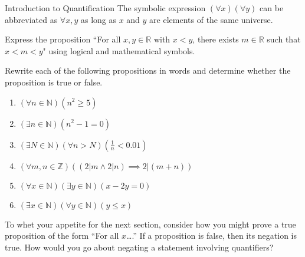 \begin{section}{Introduction to Quantification}
The symbolic expression $(\forall x)(\forall y)$ can be abbreviated as $\boxed{\forall x,y}$ as long as $x$ and $y$ are elements of the same universe.

\begin{problem}
Express the proposition ``For all $x,y\in\mathbb{R}$ with $x<y$, there exists $m\in\mathbb{R}$ such that $x<m<y$" using logical and mathematical symbols.
\end{problem}

\begin{problem}
Rewrite each of the following propositions in words and determine whether the proposition is true or false.
\begin{enumerate}[label=\textrm{(\alph*)}]
\item $(\forall n \in \mathbb{N})(n^2 \geq 5)$
\item $(\exists n \in \mathbb{N})(n^2-1=0)$
\item $(\exists N \in \mathbb{N})(\forall  n > N)(\frac{1}{n} < 0.01)$
\item $(\forall m, n \in \mathbb{Z})((2|m \wedge 2|n) \implies 2|(m+n))$
\item $(\forall x \in \mathbb{N})(\exists y \in \mathbb{N})(x-2y=0)$
\item $(\exists x \in \mathbb{N})(\forall y \in \mathbb{N})(y \leq x)$
\end{enumerate}
\end{problem}

To whet your appetite for the next section, consider how you might prove a true proposition of the form ``For all $x$\ldots.'' If a proposition is false, then its negation is true. How would you go about negating a statement involving quantifiers? 

\end{section}
